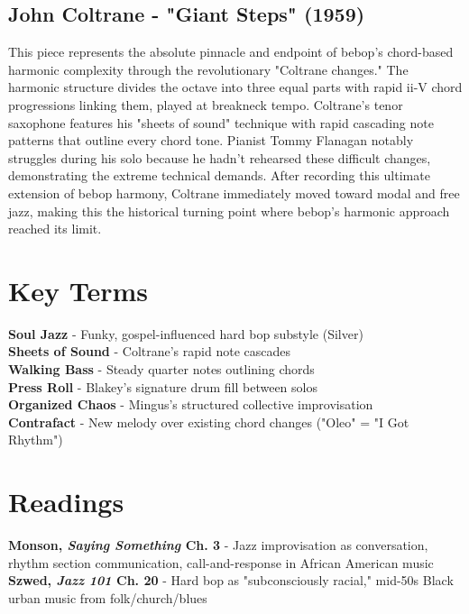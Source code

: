 \documentclass[11pt]{article}
\begin{document}
\subsection*{John Coltrane - "Giant Steps" (1959)}
This piece represents the absolute pinnacle and endpoint of bebop's chord-based harmonic complexity through the revolutionary "Coltrane changes." The harmonic structure divides the octave into three equal parts with rapid ii-V chord progressions linking them, played at breakneck tempo. Coltrane's tenor saxophone features his "sheets of sound" technique with rapid cascading note patterns that outline every chord tone. Pianist Tommy Flanagan notably struggles during his solo because he hadn't rehearsed these difficult changes, demonstrating the extreme technical demands. After recording this ultimate extension of bebop harmony, Coltrane immediately moved toward modal and free jazz, making this the historical turning point where bebop's harmonic approach reached its limit.

\section*{Key Terms}

\textbf{Soul Jazz} - Funky, gospel-influenced hard bop substyle (Silver) \\
\textbf{Sheets of Sound} - Coltrane's rapid note cascades \\
\textbf{Walking Bass} - Steady quarter notes outlining chords \\
\textbf{Press Roll} - Blakey's signature drum fill between solos \\
\textbf{Organized Chaos} - Mingus's structured collective improvisation \\
\textbf{Contrafact} - New melody over existing chord changes ("Oleo" = "I Got Rhythm")

\section*{Readings}

\textbf{Monson, \emph{Saying Something} Ch. 3} - Jazz improvisation as conversation, rhythm section communication, call-and-response in African American music \\
\textbf{Szwed, \emph{Jazz 101} Ch. 20} - Hard bop as "subconsciously racial," mid-50s Black urban music from folk/church/blues
\end{document}
